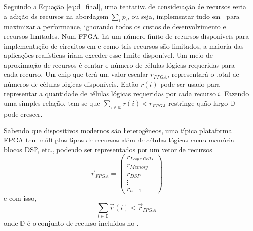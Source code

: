          Seguindo a Equação \ref{eq:d_final}, uma tentativa de consideração de recursos seria a adição de recursos na abordagem $\sum_i p_i$, ou seja,  implementar tudo em \hardware\ para maximizar a performance, ignorando todos os custos de desenvolvimento e recursos limitados.
         Num FPGA, há um número finito de recursos disponíveis para implementação de circuitos em \hardware e como tais recursos são limitados, a maioria das aplicações realísticas iriam exceder esse limite disponível.
         Um meio de aproximação de recursos é contar o número de células lógicas requeridas para cada recurso.
         Um chip que terá um valor escalar $ r_{FPGA} $, representará o total de números de células lógicas disponíveis.
         Então $ r(i) $ pode ser usado para representar a quantidade de células lógicas requeridas por cada recurso $ i $.
         Fazendo uma simples relação, tem-se que $ \sum_{i \in \mathbb{D}} r(i) < r_{FPGA} $ restringe quão largo $ \mathbb{D} $ pode crescer.

         Sabendo que dispositivos modernos são heterogêneos, uma típica plataforma FPGA tem múltiplos tipos de recursos além de células lógicas como memória, blocos DSP, etc., podendo ser representados por um vetor de recursos
         \begin{equation}
            \vec{r}_{FPGA} =
            \begin{pmatrix}
            r_{Logic\ Cells} \\
            r_{Memory}\\
            r_{DSP}\\
            \vdots \\
            r_{n-1}
            \end{pmatrix}
         \end{equation}
         e com isso,
         \begin{equation}
            \sum_{i \in \mathbb{D}} \vec{r}(i) < \vec{r}_{FPGA}
         \end{equation}
         onde $ \mathbb{D} $ é o conjunto de recurso incluídos no \design.



